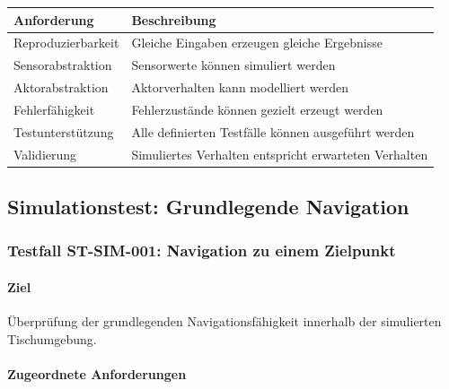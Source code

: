 \begin{longtable}[]{@{}
  >{\raggedright\arraybackslash}p{}
  >{\raggedright\arraybackslash}p{}@{}}
\toprule\noalign{}
\begin{minipage}[b]{\linewidth}\raggedright
Anforderung
\end{minipage} & \begin{minipage}[b]{\linewidth}\raggedright
Beschreibung
\end{minipage} \\
\midrule\noalign{}
\endhead
\bottomrule\noalign{}
\endlastfoot
Reproduzierbarkeit & Gleiche Eingaben erzeugen gleiche Ergebnisse \\
Sensorabstraktion & Sensorwerte können simuliert werden \\
Aktorabstraktion & Aktorverhalten kann modelliert werden \\
Fehlerfähigkeit & Fehlerzustände können gezielt erzeugt werden \\
Testunterstützung & Alle definierten Testfälle können ausgeführt
werden \\
Validierung & Simuliertes Verhalten entspricht erwarteten Verhalten \\
\end{longtable}

\subsection{Simulationstest: Grundlegende
Navigation}\label{simulationstest-grundlegende-navigation}

\subsubsection{Testfall ST-SIM-001: Navigation zu einem
Zielpunkt}\label{testfall-st-sim-001-navigation-zu-einem-zielpunkt}

\paragraph{Ziel}\label{ziel-16}

Überprüfung der grundlegenden Navigationsfähigkeit innerhalb der
simulierten Tischumgebung.

\paragraph{Zugeordnete
Anforderungen}\label{zugeordnete-anforderungen-16}

